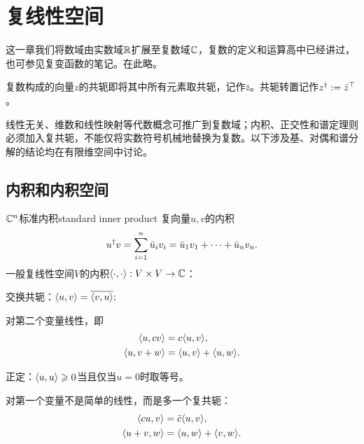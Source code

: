 \chapter{复线性空间}
\label{chap:complex linear space}

这一章我们将数域由实数域$\mathbb{R}$扩展至复数域$\mathbb{C}$，复数的定义和运算高中已经讲过，也可参见复变函数的笔记。在此略。

复数构成的向量$z$的共轭即将其中所有元素取共轭，记作$\bar z$。共轭转置记作$z^\dagger := \bar z^\top$。

线性无关、维数和线性映射等代数概念可推广到复数域；内积、正交性和谱定理则必须加入复共轭，不能仅将实数符号机械地替换为复数。以下涉及基、对偶和谱分解的结论均在有限维空间中讨论。
\section{内积和内积空间}
\begin{definition}{$\mathbb{C}^n$标准内积}{standard inner product}
	复向量$u,v$的内积
	\begin{equation}\label{eq:la-complex-inner-product}
		u^\dagger v = \sum_{i=1}^n\bar u_iv_i = \bar u_1v_1 + \cdots + \bar u_nv_n.
	\end{equation}
	\tcblower
	一般复线性空间$V$的内积$\langle\cdot,\cdot\rangle :V \times V \to \mathbb{C}$：
	\begin{compactitem}
		\item 交换共轭：$\langle u,v\rangle = \overline{\langle v,u\rangle};$
		\item 对第二个变量线性，即
		\begin{subequations}\label{eq:la-inner-product-linearity}
			\begin{align}
				\langle u,cv\rangle &= c\langle u,v\rangle,\\
				\langle u,v + w\rangle &= \langle u,v\rangle + \langle u,w\rangle.
			\end{align}
		\end{subequations}
		\item 正定：$\langle u,u\rangle \geqslant 0$当且仅当$u = 0$时取等号。
	\end{compactitem}
\end{definition}
\begin{remark}
	对第一个变量不是简单的线性，而是多一个复共轭：
	\begin{subequations}\label{eq:la-inner-product-antilinearity}
		\begin{align}
			\langle cu,v\rangle &= \bar c\langle u,v\rangle,\\
			\langle u + v,w\rangle &= \langle u,w\rangle + \langle v,w\rangle.
		\end{align}
	\end{subequations}
\end{remark}
